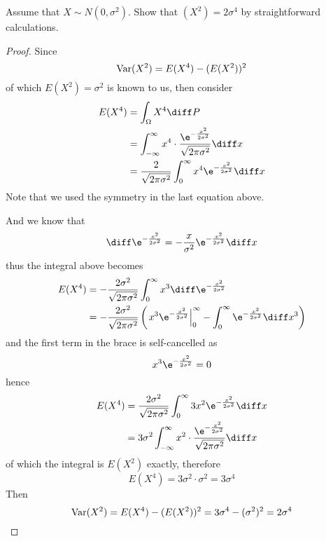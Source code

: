     \problem
    \begin{question}
        Assume that $X\sim N(0,\sigma^2)$.  Show that $(X^2)=2\sigma^4$
        by straightforward calculations.
    \end{question}
    \newcommand{\epower}{\e^{-\frac{x^2}{2\sigma^2}}}
    \newcommand{\const}{\sqrt{2\pi\sigma^2}}
    \begin{proof}
        Since
        \[\mathrm{Var}(X^2)=E(X^4)-(E(X^2))^2\]
        of which $E(X^2)=\sigma^2$ is known to us,
        then consider
        \[\begin{aligned}
            E(X^4)&=\int_{\Omega}X^4\diff P\\
            &=\int_{-\infty}^\infty x^4\cdot
            \frac{\epower}{\const}\diff x\\
            &=\frac{2}{\const}\int_0^\infty x^4\epower\diff x
        \end{aligned}\]
        Note that we used the symmetry in the last equation above.

        And we know that
        \[\diff \epower=-\frac{x}{\sigma^2}\epower\diff x\]
        thus the integral above becomes
        \[\begin{aligned}
            E(X^4)&=-\frac{2\sigma^2}{\const}\int_0^\infty x^3\diff\epower\\
            &=-\frac{2\sigma^2}{\const}\left(\left.x^3\epower\right|^\infty_0
            -\int_0^\infty\epower\diff x^3\right)
        \end{aligned}\]
        and the first term in the brace is self-cancelled as
        \[x^3\epower=0\]
        hence
        \[\begin{aligned}
            E(X^4)&=\frac{2\sigma^2}{\const}\int_0^\infty 3x^2\epower\diff x\\
            &=3\sigma^2\int_{-\infty}^\infty x^2\cdot\frac{\epower}{\const}\diff x
        \end{aligned}\]
        of which the integral is $E(X^2)$ exactly, therefore
        \[E(X^4)=3\sigma^2\cdot \sigma^2=3\sigma^4\]
        Then
        \[\mathrm{Var}(X^2)=E(X^4)-(E(X^2))^2=3\sigma^4-(\sigma^2)^2=2\sigma^4\]
    \end{proof}


